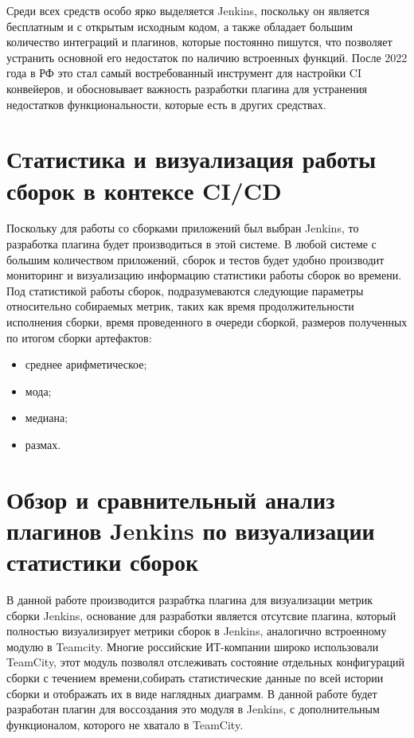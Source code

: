 Среди всех средств особо ярко выделяется Jenkins, поскольку он является бесплатным и с открытым исходным кодом, а также обладает большим количество интеграций и плагинов, которые постоянно пишутся, что позволяет устранить основной его недостаток по наличию встроенных функций. После 2022 года в РФ это стал самый востребованный инструмент для настройки CI конвейеров, и обосновывает важность разработки плагина для устранения недостатков функциональности, которые есть в других средствах.
 
 
 \section{Статистика и визуализация работы сборок в контексе CI/CD} \label{ch1:sec4}
 
Поскольку для работы со сборками приложений был выбран Jenkins, то разработка плагина будет производиться в этой системе. В любой системе с большим количеством приложений, сборок и тестов будет удобно производит мониторинг и визуализацию информацию статистики работы сборок во времени. Под статистикой работы сборок, подразумеваются следующие параметры относительно собираемых метрик, таких как время продолжительности исполнения сборки, время проведенного в очереди сборкой, размеров полученных по итогом сборки артефактов:
 
\begin{itemize}
	\item среднее арифметическое;
	\item мода;
	\item медиана;
	\item размах.
\end{itemize}
 
	
\section{Обзор и сравнительный анализ плагинов Jenkins по визуализации статистики сборок} \label{ch1:sec5}

В данной работе производится разрабтка плагина для визуализации метрик сборки Jenkins, основание для разработки является отсутсвие плагина, который полностью визуализирует метрики сборок в Jenkins, аналогично встроенному модулю в Teamcity. Многие российские ИТ-компании широко использовали TeamCity, этот модуль позволял отслеживать состояние отдельных конфигураций сборки с течением времени,собирать статистические данные по всей истории сборки и отображать их в виде наглядных диаграмм. В данной работе будет разработан плагин для воссоздания это модуля в Jenkins, с дополнительным функционалом, которого не хватало в TeamCity.

